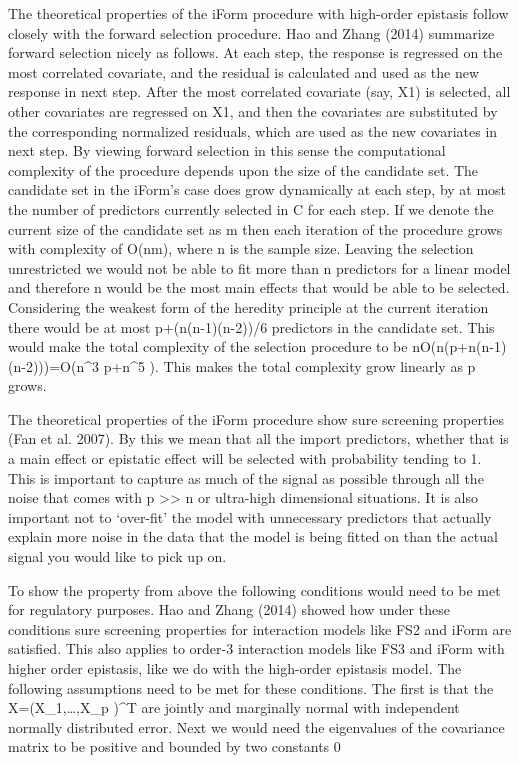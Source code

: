 \documentclass[]{book}
\theoremstyle{definition}
\theoremstyle{definition}
\theoremstyle{remark}
\begin{document}
The theoretical properties of the iForm procedure with high-order
epistasis follow closely with the forward selection procedure. Hao and
Zhang (2014) summarize forward selection nicely as follows. At each
step, the response is regressed on the most correlated covariate, and
the residual is calculated and used as the new response in next step.
After the most correlated covariate (say, X1) is selected, all other
covariates are regressed on X1, and then the covariates are substituted
by the corresponding normalized residuals, which are used as the new
covariates in next step. By viewing forward selection in this sense the
computational complexity of the procedure depends upon the size of the
candidate set. The candidate set in the iForm's case does grow
dynamically at each step, by at most the number of predictors currently
selected in C for each step. If we denote the current size of the
candidate set as m then each iteration of the procedure grows with
complexity of O(nm), where n is the sample size. Leaving the selection
unrestricted we would not be able to fit more than n predictors for a
linear model and therefore n would be the most main effects that would
be able to be selected. Considering the weakest form of the heredity
principle at the current iteration there would be at most
p+(n(n-1)(n-2))/6 predictors in the candidate set. This would make the
total complexity of the selection procedure to be
nO(n(p+n(n-1)(n-2)))=O(n\^{}3 p+n\^{}5 ). This makes the total
complexity grow linearly as p grows.

The theoretical properties of the iForm procedure show sure screening
properties (Fan et al. 2007). By this we mean that all the import
predictors, whether that is a main effect or epistatic effect will be
selected with probability tending to 1. This is important to capture as
much of the signal as possible through all the noise that comes with p
\textgreater{}\textgreater{} n or ultra-high dimensional situations. It
is also important not to `over-fit' the model with unnecessary
predictors that actually explain more noise in the data that the model
is being fitted on than the actual signal you would like to pick up on.

To show the property from above the following conditions would need to
be met for regulatory purposes. Hao and Zhang (2014) showed how under
these conditions sure screening properties for interaction models like
FS2 and iForm are satisfied. This also applies to order-3 interaction
models like FS3 and iForm with higher order epistasis, like we do with
the high-order epistasis model. The following assumptions need to be met
for these conditions. The first is that the X=(X\_1,\ldots{},X\_p )\^{}T
are jointly and marginally normal with independent normally distributed
error. Next we would need the eigenvalues of the covariance matrix to be
positive and bounded by two constants 0
\end{document}

